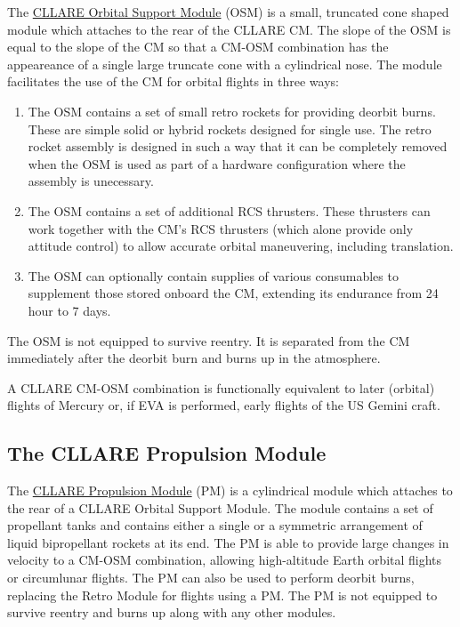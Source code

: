 \documentclass{report}
\begin{document}
The \href{http://cstart.org/wiki/CLLARE_Orbital_Support_Module}{CLLARE Orbital Support Module} (OSM) is a small, truncated cone shaped module which attaches to the rear of the CLLARE CM.  The slope of the OSM is equal to the slope of the CM so that a CM-OSM combination has the appeareance of a single large truncate cone with a cylindrical nose.  The module facilitates the use of the CM for orbital flights in three ways:
\begin{enumerate}
\item The OSM contains a set of small retro rockets for providing deorbit burns.  These are simple solid or hybrid rockets designed for single use.  The retro rocket assembly is designed in such a way that it can be completely removed when the OSM is used as part of a hardware configuration where the assembly is unecessary.
\item The OSM contains a set of additional RCS thrusters.  These thrusters can work together with the CM's RCS thrusters (which alone provide only attitude control) to allow accurate orbital maneuvering, including translation.
\item The OSM can optionally contain supplies of various consumables to supplement those stored onboard the CM, extending its endurance from 24 hour to 7 days.
\end{enumerate}
The OSM is not equipped to survive reentry.  It is separated from the CM immediately after the deorbit burn and burns up in the atmosphere.

A CLLARE CM-OSM combination is functionally equivalent to later (orbital) flights of Mercury or, if EVA is performed, early flights of the US Gemini craft.

\subsection{The CLLARE Propulsion Module}

The \href{http://cstart.org/wiki/CLLARE_Propulsion_Module}{CLLARE Propulsion Module} (PM) is a cylindrical module which attaches to the rear of a CLLARE Orbital Support Module.  The module contains a set of propellant tanks and contains either a single or a symmetric arrangement of liquid bipropellant rockets at its end.  The PM is able to provide large changes in velocity to a CM-OSM combination, allowing high-altitude Earth orbital flights or circumlunar flights.  The PM can also be used to perform deorbit burns, replacing the Retro Module for flights using a PM.  The PM is not equipped to survive reentry and burns up along with any other modules.
\end{document}
